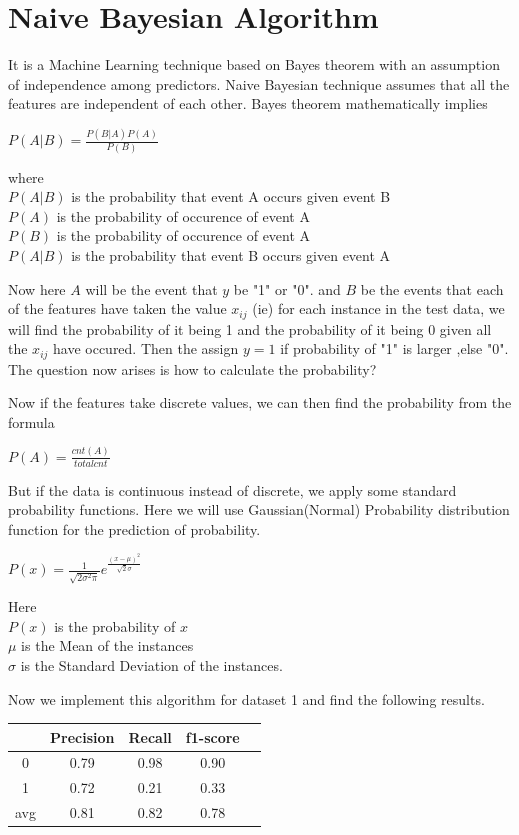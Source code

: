 \section{ Naive Bayesian Algorithm}
  It is a Machine Learning technique based on Bayes theorem with an assumption of independence among predictors. Naive Bayesian technique assumes that all the features are independent of each other. Bayes theorem mathematically implies\begin{center}
  $P(A|B) = \frac{P(B|A) P(A)}{P(B)}$ ~\cite{rish2001empirical}
  \end{center}
  where \\
  $P(A|B)$ is the probability that event A occurs given event B\\
  $P(A)$ is the probability of occurence of event A\\
  $P(B)$ is the probability of occurence of event A\\
  $P(A|B)$ is the probability that event B occurs given event A\par
Now here $A$ will be the event that $y$ be "1" or "0". and $B$ be the events that each of the features have taken the value $x_{ij}$ (ie) for each instance in the test data, we will find the probability of it being 1 and the probability of it being 0 given all the $x_{ij}$ have occured. Then the assign $y=1$ if probability of "1" is larger ,else "0". The question now arises is how to calculate the probability?\par
  Now if the features take discrete values, we can then find the probability from the formula \begin{center}
  $P(A)= \frac{cnt(A)}{totalcnt}$
\end{center}
 But if the data is continuous instead of discrete, we apply some standard probability functions. Here we will use Gaussian(Normal) Probability distribution function for the prediction of probability.\begin{center}
	$P(x) = \frac{1}{\sqrt{2\sigma^{2}\pi}}e^{\frac{(x-\mu)^{2}}{\sqrt{2}\sigma}}$
\end{center}
Here \\$P(x)$ is the probability of $x$\\ $\mu$ is the Mean of the instances \\ $\sigma$ is the Standard Deviation of the instances. ~\cite{rish2001empirical}
\par Now we implement this algorithm for dataset 1 and find the following results.
\begin{center}
\begin{tabular}{| c | c | c | c | c |}
\hline
    & Precision & Recall & f1-score \\
\hline
0 & 0.79 & 0.98 & 0.90 \\
\hline
1 & 0.72 & 0.21 & 0.33 \\
\hline
avg & 0.81 & 0.82 & 0.78 \\
\hline
\end{tabular}
\end{center}
